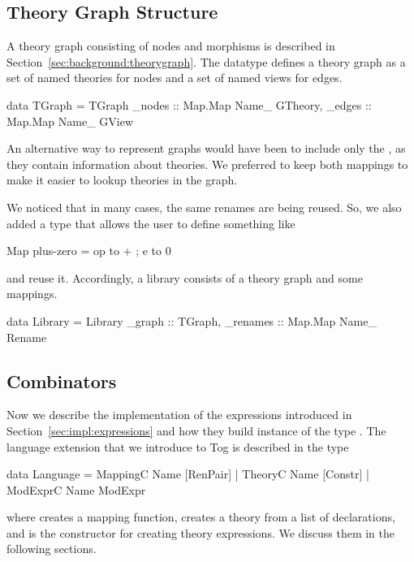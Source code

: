\subsection{Theory Graph Structure}
\label{subsec:graph}
A theory graph consisting of nodes and morphisms is described in Section~\ref{sec:background:theorygraph}. The datatype  defines a theory graph as a set of named theories for nodes and a set of named views for edges. 
\begin{hscode}
data TGraph = TGraph { 
  _nodes :: Map.Map Name_ GTheory,
  _edges :: Map.Map Name_ GView } 
\end{hscode}
An alternative way to represent graphs would have been to include only the , as they contain information about theories. We preferred to keep both mappings to make it easier to lookup theories in the graph. 

We noticed that in many cases, the same renames are being reused. So, we also added a  type that allows the user to define something like 
\begin{hscode}
Map plus-zero = {op to + ; e to 0}
\end{hscode}
\noindent and reuse it. Accordingly, a library consists of a theory graph and some mappings. 
\begin{hscode}
data Library = Library {
  _graph   :: TGraph,
  _renames :: Map.Map Name_ Rename }
\end{hscode}

\subsection{Combinators}
\label{subsec:combinatorsImpl}
Now we describe the implementation of the expressions introduced in Section~\ref{sec:impl:expressions} and how they build instance of the type .  
The language extension that we introduce to Tog is described in the type  
\begin{togcode}
data Language = 
    MappingC Name [RenPair]
  | TheoryC Name [Constr]
  | ModExprC Name ModExpr
\end{togcode}
\noindent where  creates a mapping function,  creates a theory from a list of declarations, and  is the constructor for creating theory expressions. We discuss them in the following sections. 


